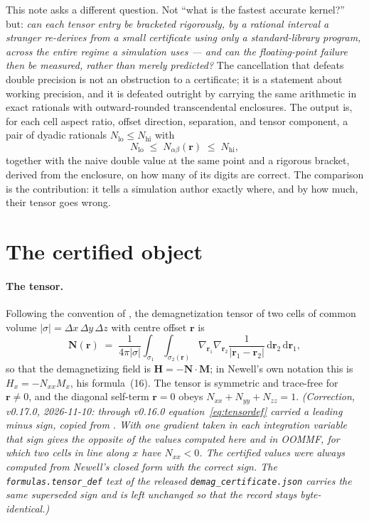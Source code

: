 \documentclass[11pt]{amsart}
\theoremstyle{plain}
\theoremstyle{definition}
\theoremstyle{remark}
\begin{document}
This note asks a different question. Not ``what is the fastest accurate
kernel?'' but: \emph{can each tensor entry be bracketed rigorously, by a rational
interval a stranger re-derives from a small certificate using only a
standard-library program, across the entire regime a simulation uses --- and can
the floating-point failure then be measured, rather than merely predicted?} The
cancellation that defeats double precision is not an obstruction to a
certificate; it is a statement about working precision, and it is defeated
outright by carrying the same arithmetic in exact rationals with outward-rounded
transcendental enclosures. The output is, for each cell aspect ratio, offset
direction, separation, and tensor component, a pair of dyadic rationals
$N_{\mathrm{lo}}\le N_{\mathrm{hi}}$ with
\[
   N_{\mathrm{lo}} \;\le\; N_{\alpha\beta}(\mathbf r) \;\le\; N_{\mathrm{hi}},
\]
together with the naive double value at the same point and a rigorous bracket,
derived from the enclosure, on how many of its digits are correct. The
comparison is the contribution: it tells a simulation author exactly where, and
by how much, their tensor goes wrong.

\section{The certified object}\label{sec:object}

\paragraph{The tensor.}
Following the convention of \cite{CF2015}, the demagnetization tensor of two
cells of common volume $|\sigma|=\Delta x\,\Delta y\,\Delta z$ with centre
offset $\mathbf r$ is
\begin{equation}
  \mathbf N(\mathbf r) \;=\; \frac{1}{4\pi|\sigma|}
  \int_{\sigma_1}\!\!\int_{\sigma_2(\mathbf r)}
  \nabla_{\mathbf r_1}\nabla_{\mathbf r_2}\frac{1}{|\mathbf r_1-\mathbf r_2|}
  \,\mathrm d\mathbf r_2\,\mathrm d\mathbf r_1 ,
  \label{eq:tensordef}
\end{equation}
so that the demagnetizing field is $\mathbf H=-\mathbf N\cdot\mathbf M$; in
Newell's own notation \cite{Newell1993} this is $H_x=-N_{xx}M_x$, his
formula~(16). The tensor is symmetric and trace-free for $\mathbf r\neq 0$, and
the diagonal self-term $\mathbf r=0$ obeys $N_{xx}+N_{yy}+N_{zz}=1$.
\emph{(Correction, v0.17.0, 2026-11-10: through v0.16.0 equation~\eqref{eq:tensordef}
carried a leading minus sign, copied from \cite[eq.~(2)]{CF2015}. With one
gradient taken in each integration variable that sign gives the opposite of the
values computed here and in OOMMF, for which two cells in line along $x$ have
$N_{xx}<0$. The certified values were always computed from Newell's closed form
with the correct sign. The \texttt{formulas.tensor\_def} text of the released
\texttt{demag\_certificate.json} carries the same superseded sign and is left
unchanged so that the record stays byte-identical.)}
\end{document}
